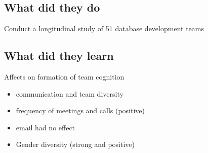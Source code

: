 \subsection{What did they do}

Conduct a longitudinal study of 51 database development teams

\subsection{What did they learn}

Affects on formation of team cognition

\begin{itemize}
    \item communication and team diversity
    \item frequency of meetings and calls (positive)
    \item email had no effect
    \item Gender diversity (strong and positive)
\end{itemize}

